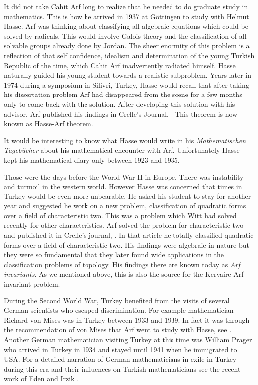 \documentclass[12pt]{amsart}
\begin{document}
It did not take Cahit Arf long to realize  that he needed to do  graduate study  in mathematics. This is how he arrived in 1937
at G\"{o}ttingen to study with Helmut Hasse. Arf was thinking about classifying all algebraic equations which could be solved by radicals. This would involve Galois theory and the classification of all solvable groups already done by Jordan. The sheer enormity of this problem is a reflection of that self confidence, idealism and determination of the young Turkish Republic of the time, which Cahit Arf inadvertently radiated himself. Hasse naturally guided his young student towards a realistic subproblem. Years later in 1974 during a symposium in Silivri, Turkey, Hasse would recall that after taking his dissertation problem Arf had disappeared from the scene for a few months only to come back with the solution.  After developing this solution with his advisor, Arf published his findings in Crelle's Journal, \cite{carf1}. This theorem is now known as Hasse-Arf theorem.

It would be interesting to know what Hasse would write in his \emph{Mathematischen Tageb\"{u}cher} about his mathematical encounter with Arf. Unfortunately Hasse kept his mathematical diary only between 1923 and 1935.

Those were the  days before the World War II in Europe. There was instability and turmoil in the western world. However Hasse was concerned that times in Turkey would be even more unbearable. He asked his student to stay for another year and suggested he work on a new problem, classification of quadratic forms over a field of characteristic two. This was a problem which Witt had solved recently for other characteristics. Arf solved the problem for characteristic two and published it in Crelle's journal, \cite{carf2}. In that article he totally classified quadratic forms over a field of characteristic two. His findings were  algebraic in nature but they were so fundamental that they later found wide applications in the classification problems of topology. His findings there are known today as \emph{Arf invariants}. As we mentioned above, this is also the source for the Kervaire-Arf invariant problem.

During the Second World War, Turkey  benefited from the visits of several  German scientists who escaped discrimination. For example mathematician Richard von Mises was in Turkey between 1933 and 1939. In fact it was through the recommendation of von Mises that Arf went to study with Hasse, see \cite{alp}. Another German mathematician visiting Turkey at this time was  William Prager who arrived in Turkey in 1934 and stayed until 1941 when he immigrated to USA. For a detailed narration of German mathematicians in exile in Turkey during this era and their influences on Turkish mathematicians see the recent work of Eden and Irzik \cite{alp}.
\end{document}
